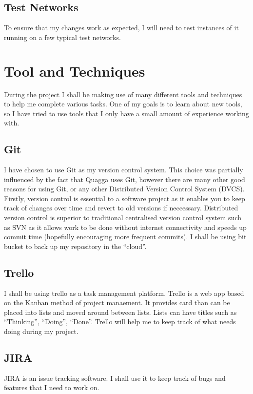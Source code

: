\documentclass[12pt]{report}
\begin{document}

\section{Test Networks}
To ensure that my changes work as expected, I will need to test instances of it
running on a few typical test networks. 


\chapter{Tool and Techniques}

During the project I shall be making use of many different tools and techniques
to help me complete various tasks. One of my goals is to learn about new tools,
so I have tried to use tools that I only have a small amount of experience
working with. 

\section{Git}
I have chosen to use Git as my version control system. This choice was
partially influenced by the fact that Quagga uses Git, however there are many
other good reasons for using Git, or any other Distributed Version Control
System (DVCS). Firstly, version control is essential to a software project as
it enables you to keep track of changes over time and revert to old versions if
neccessary. Distributed version control is superior to traditional centralised 
version control system such as SVN as it allows work to be done without internet
connectivity and speeds up commit time (hopefully encouraging more frequent
commits). I shall be using bit bucket to back up my repository in the ``cloud''.

\section{Trello}
I shall be using trello as a task management platform. Trello is a web app based 
on the Kanban method of project manaement. It provides card than can be placed
into lists and moved around between lists. Lists can have titles such as
``Thinking'', ``Doing'', ``Done''. Trello will help me to keep track of what
needs doing during my project.

\section{JIRA}
JIRA is an issue tracking software. I shall use it to keep track of bugs and
features that I need to work on. 
\end{document}
